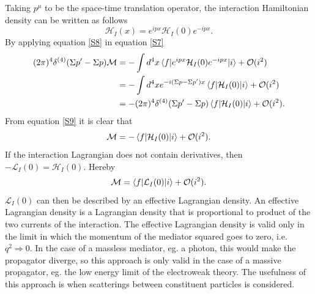 Taking $p^\mu$ to be the space-time translation operator, the interaction Hamiltonian density can be written as follows
\begin{equation}
	\mathcal{H}_I(x)=e^{ipx}\mathcal{H}_{I}(0)e^{-ipx}.
	\label{S8}
\end{equation} 
By applying equation \eqref{S8} in equation \eqref{S7}
\begin{equation}
	\begin{split}
		(2\pi)^4\delta^{(4)}(\Sigma p'-\Sigma p)\mathcal{M}&=-\int d^4x\braket{f|e^{ipx}\mathcal{H}_I(0)e^{-ipx}|i}+\mathcal{O}(i^2)\\
		&=-\int d^4xe^{-i(\Sigma p-\Sigma p')x} \braket{f|\mathcal{H}_I(0)|i}+\mathcal{O}(i^2)\\
		&=-(2\pi)^4\delta^{(4)}(\Sigma p'-\Sigma p) \braket{f|\mathcal{H}_I(0)|i}+\mathcal{O}(i^2).\\
	\end{split}
	\label{S9}
\end{equation} 
From equation \eqref{S9} it is clear that
\begin{equation}
	\mathcal{M}=-\braket{f|\mathcal{H}_I(0)|i}+\mathcal{O}(i^2).
\end{equation} 
If the interaction Lagrangian does not contain derivatives, then $-\mathcal{L}_I(0)=\mathcal{H}_I(0)$. Hereby
\begin{equation}
	\mathcal{M}=\braket{f|\mathcal{L}_I(0)|i}+\mathcal{O}(i^2).
	\label{S10}
\end{equation} 
$\mathcal{L}_I(0)$ can then be described by an effective Lagrangian density. An effective Lagrangian density is a Lagrangian density that is proportional to product of the two currents of the interaction. The effective Lagrangian density is valid only in the limit in which the momentum of the mediator squared goes to zero, i.e. $q^2\Rightarrow 0$. In the case of a massless mediator, eg. a photon, this would make the propagator diverge, so this approach is only valid in the case of a massive propagator, eg. the low energy limit of the electroweak theory. The usefulness of this approach is when scatterings between constituent particles is considered. 

